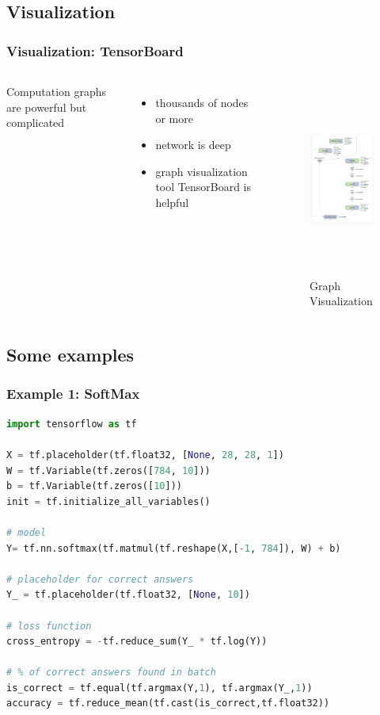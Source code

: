 \subsection{Visualization}

\begin{frame}
  \MyLogo
  \frametitle{Visualization: TensorBoard}  

\begin{columns}
\scriptsize{
Computation graphs are powerful but complicated
\begin{itemize}
\item  thousands of nodes or more 
\item  network is deep
\item  graph visualization tool TensorBoard is helpful
\end{itemize}
}
%
\begin{figure}[htbp] 
   \includegraphics[height=2.5in]{figures/graphvisualization.png} 
\caption{Graph Visualization}
\end{figure}
\end{columns}

\end{frame}

\subsection{Some examples}

\begin{frame}[fragile]
  \MyLogo
  \frametitle{Example 1: SoftMax}  
 
\scriptsize{
\begin{lstlisting}[language=python]
import tensorflow as tf    

X = tf.placeholder(tf.float32, [None, 28, 28, 1])     
W = tf.Variable(tf.zeros([784, 10]))    
b = tf.Variable(tf.zeros([10]))   
init = tf.initialize_all_variables() 

# model
Y= tf.nn.softmax(tf.matmul(tf.reshape(X,[-1, 784]), W) + b)  

# placeholder for correct answers    
Y_ = tf.placeholder(tf.float32, [None, 10])  

# loss function   
cross_entropy = -tf.reduce_sum(Y_ * tf.log(Y))  

# % of correct answers found in batch
is_correct = tf.equal(tf.argmax(Y,1), tf.argmax(Y_,1))  
accuracy = tf.reduce_mean(tf.cast(is_correct,tf.float32))  
\end{lstlisting}
}
\end{frame}

